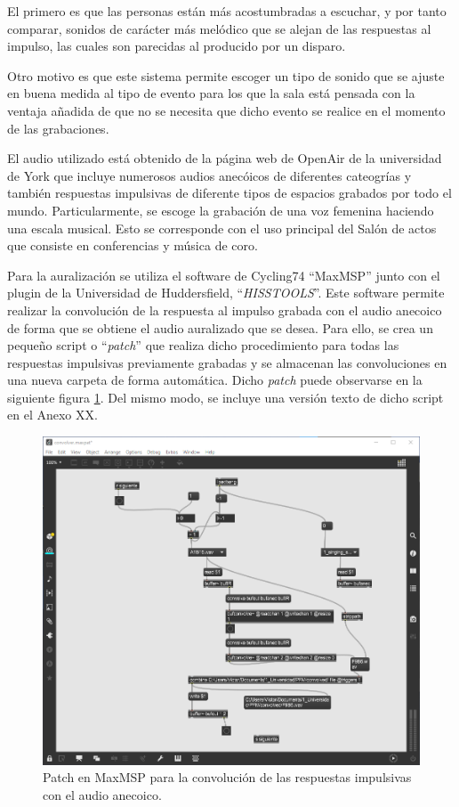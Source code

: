 \documentclass[11pt,a4paper,twoside]{book}
\begin{document}
                El primero es que las personas están más acostumbradas a escuchar, y por tanto comparar, sonidos de carácter más melódico que se alejan de las respuestas al impulso, las cuales son parecidas al producido por un disparo.
        
                Otro motivo es que este sistema permite escoger un tipo de sonido que se ajuste en buena medida al tipo de evento para los que la sala está pensada con la ventaja añadida de que no se necesita que dicho evento se realice en el momento de las grabaciones.
        
                El audio utilizado está obtenido de la página web de OpenAir de la universidad de York que incluye numerosos audios anecóicos de diferentes cateogrías y también respuestas impulsivas de diferente tipos de espacios grabados por todo el mundo. Particularmente, se escoge la grabación de una voz femenina haciendo una escala musical. Esto se corresponde con el uso principal del Salón de actos que consiste en conferencias y música de coro.
        
                Para la auralización se utiliza el software de Cycling74 ``MaxMSP'' junto con el plugin de la Universidad de Huddersfield, ``\textit{HISSTOOLS}''. Este software permite realizar la convolución de la respuesta al impulso grabada con el audio anecoico de forma que se obtiene el audio auralizado que se desea. Para ello, se crea un pequeño script o ``\textit{patch}'' que realiza dicho procedimiento para todas las respuestas impulsivas previamente grabadas y se almacenan las convoluciones en una nueva carpeta de forma automática. Dicho \textit{patch} puede observarse en la siguiente figura \ref{fig:convolver_max}. Del mismo modo, se incluye una versión texto de dicho script en el Anexo XX.
        
                \begin{figure}
	                \includegraphics[scale=0.4]{../imagenes/convolver_max.png}
			        \centering
			        \caption{Patch en MaxMSP para la convolución de las respuestas impulsivas con el audio anecoico.}
			        \label{fig:convolver_max}
	            \end{figure}
        
\end{document}
